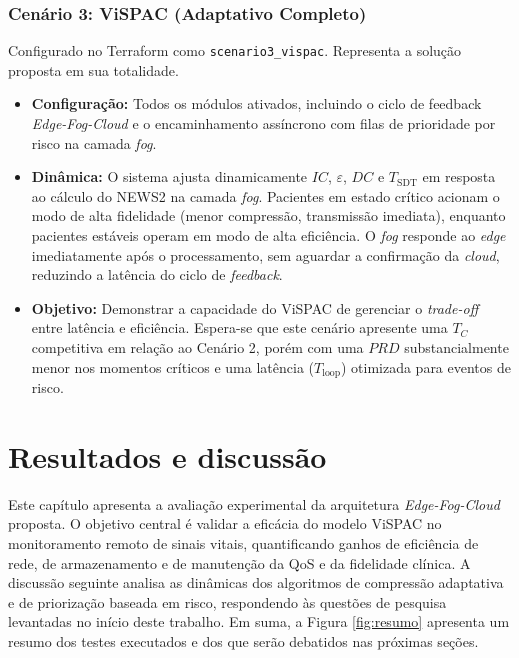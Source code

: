 \documentclass[twoside,english,brazilian]{UNISINOSmonografia}
\begin{document}
\subsection{Cenário 3: ViSPAC (Adaptativo Completo)}
Configurado no Terraform como \texttt{scenario3\_vispac}. Representa a solução proposta em sua totalidade.
\begin{itemize}
    \item \textbf{Configuração:} Todos os módulos ativados, incluindo o ciclo de feedback \textit{Edge-Fog-Cloud} e o encaminhamento assíncrono com filas de prioridade por risco na camada \textit{fog}.
    \item \textbf{Dinâmica:} O sistema ajusta dinamicamente $IC$, $\varepsilon$, $DC$ e $T_{\text{SDT}}$ em resposta ao cálculo do NEWS2 na camada \textit{fog}. Pacientes em estado crítico acionam o modo de alta fidelidade (menor compressão, transmissão imediata), enquanto pacientes estáveis operam em modo de alta eficiência. O \textit{fog} responde ao \textit{edge} imediatamente após o processamento, sem aguardar a confirmação da \textit{cloud}, reduzindo a latência do ciclo de \textit{feedback}.
    \item \textbf{Objetivo:} Demonstrar a capacidade do ViSPAC de gerenciar o \textit{trade-off} entre latência e eficiência. Espera-se que este cenário apresente uma $T_C$ competitiva em relação ao Cenário 2, porém com uma $PRD$ substancialmente menor nos momentos críticos e uma latência ($T_{\text{loop}}$) otimizada para eventos de risco.
\end{itemize}



\chapter{Resultados e discussão}
Este capítulo apresenta a avaliação experimental da arquitetura \textit{Edge-Fog-Cloud} proposta. O objetivo central é validar a eficácia do modelo ViSPAC no monitoramento remoto de sinais vitais, quantificando ganhos de eficiência de rede, de armazenamento e de manutenção da QoS e da fidelidade clínica. A discussão seguinte analisa as dinâmicas dos algoritmos de compressão adaptativa e de priorização baseada em risco, respondendo às questões de pesquisa levantadas no início deste trabalho. Em suma, a Figura \ref{fig:resumo} apresenta um resumo dos testes executados e dos que serão debatidos nas próximas seções.
\end{document}
